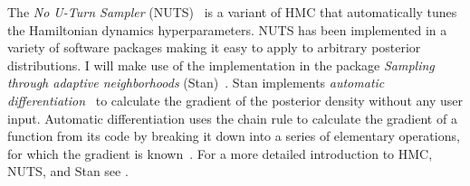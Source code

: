 \documentclass[thesis.tex]{subfiles}
\begin{document}
The \emph{No U-Turn Sampler} (NUTS)~\autocite{hoffmanNUTS} is a variant of HMC that automatically tunes the Hamiltonian dynamics hyperparameters.
NUTS has been implemented in a variety of software packages making it easy to apply to arbitrary posterior distributions.
I will make use of the implementation in the package \emph{Sampling through adaptive neighborhoods} (Stan)~\autocite{Stan-2-32-2}.
Stan implements \emph{automatic differentiation}~\autocite{griewankAutoDiff} to calculate the gradient of the posterior density without any user input.
Automatic differentiation uses the chain rule to calculate the gradient of a function from its code by breaking it down into a series of elementary operations, for which the gradient is known~\autocite{autodiff}.
For a more detailed introduction to HMC, NUTS, and Stan see \textcite[chapter 12]{gelmanBDA}.
\end{document}
